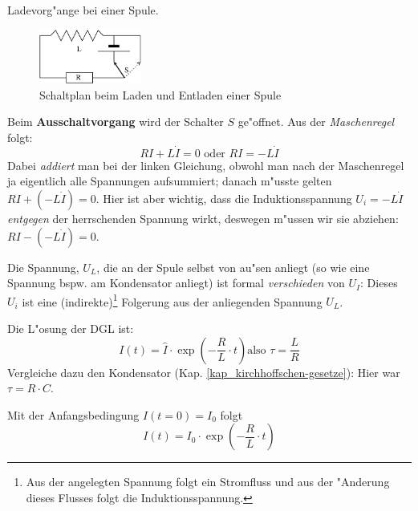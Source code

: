 \begin{Beispiel}
   Ladevorg"ange bei einer Spule.
   \begin{figure}
      \centering
      \includegraphics[width=0.3\textwidth]{bilder/laden_spule_schalt}
      \caption{Schaltplan beim Laden und Entladen einer Spule}
      \label{abb_spule_laden_schaltplan}
   \end{figure}
   Beim \textbf{Ausschaltvorgang} wird der Schalter $S$ ge"offnet. Aus
   der \emph{Maschenregel} folgt:
\begin{equation*}
   R I +  L \dot I = 0 \text{ oder } RI = -L\dot I
\end{equation*}
Dabei \emph{addiert} man bei der linken Gleichung, obwohl man nach der
Maschenregel ja eigentlich alle Spannungen aufsummiert; danach m"usste
gelten $RI + (-L \dot I) = 0$. Hier ist aber wichtig, dass die
Induktionsspannung $U_i = -L\dot I$ \emph{entgegen} der herrschenden
Spannung wirkt, deswegen m"ussen wir sie abziehen: $RI -(-L\dot I) =
0$. 

Die Spannung, $U_L$, die an der Spule selbst von au"sen anliegt
(so wie eine Spannung bspw. am Kondensator anliegt) ist
formal \emph{verschieden} von $U_I$: Dieses $U_i$ ist eine
(indirekte)\footnote{Aus der angelegten Spannung folgt ein Stromfluss
  und aus der "Anderung dieses Flusses folgt die Induktionsspannung.}
Folgerung aus der anliegenden Spannung $U_L$.


Die L"osung der DGL ist:
\begin{equation*}
   \label{eq:339}
   I(t) = \hat I \cdot \exp \left ( -\frac{ R}{L} \cdot t \right ) \text{
     also } \tau = \frac{L}{R}
\end{equation*}
Vergleiche dazu den Kondensator (Kap.
\ref{kap_kirchhoffschen-gesetze}): Hier war $\tau = R \cdot C$.

Mit der Anfangsbedingung $I(t = 0) = I_0$ folgt
\begin{equation}
   \label{eq:342}
   I(t) = I_0 \cdot\exp \left ( -\frac{ R}{L} \cdot t \right )
\end{equation}


\end{Beispiel}
